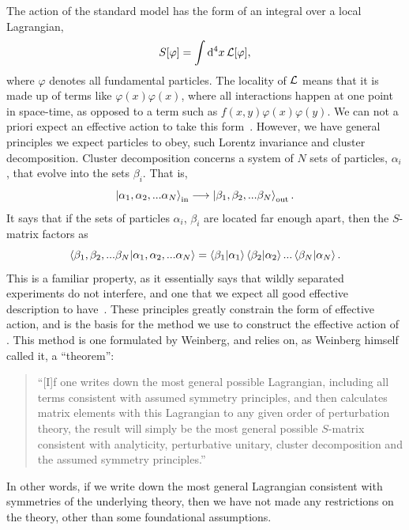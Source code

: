The action of the standard model has the form of an integral over a local Lagrangian,
\begin{equation}
    S[\varphi] = \int \dd^4 x \, \mathcal{L}[\varphi],
\end{equation}
where $\varphi$ denotes all fundamental particles.
The locality of $\mathcal{L}$ means that it is made up of terms like $\varphi(x) \varphi(x)$, where all interactions happen at one point in space-time, as opposed to a term such as $f(x, y)\varphi(x) \varphi(y)$.
We can not a priori expect an effective action to take this form~\cite{Schwartz:QFT}.
However, we have general principles we expect particles to obey, such Lorentz invariance and cluster decomposition.
Cluster decomposition concerns a system of $N$ sets of particles, $\alpha_i$, that evolve into the sets $\beta_i$.
That is,
\begin{equation}
    \ket{\alpha_1, \alpha_2, ... \alpha_N}_\text{in}
    \longrightarrow
    \ket{\beta_1, \beta_2, ... \beta_N}_\text{out}.
\end{equation}
It says that if the sets of particles $\alpha_i$, $\beta_i$ are located far enough apart, then the $S$-matrix factors as
\begin{equation}
    {\braket{\beta_1, \beta_2, ... \beta_N}{\alpha_1, \alpha_2, ... \alpha_N}}
    =
    \braket{\beta_1}{\alpha_1}\braket{\beta_2}{\alpha_2}... \braket{\beta_N}{\alpha_N}.
\end{equation}
This is a familiar property, as it essentially says that wildly separated experiments do not interfere, and one that we expect all good effective description to have~\cite{weinberg_1995,weinberg_1996_vol2}.
These principles greatly constrain the form of effective action, and is the basis for the method we use to construct the effective action of \chpt.
This method is one formulated by Weinberg, and relies on, as Weinberg himself called it, a ``theorem'':
\begin{quote}
    ``[I]f one writes down the most general possible Lagrangian, including all terms consistent with assumed symmetry principles, and then calculates matrix elements with this Lagrangian to any given order of perturbation theory, the result will simply be the most general possible $S$-matrix consistent with analyticity, perturbative unitary, cluster decomposition and the assumed symmetry principles.'' \cite{WeinbergPhenom}
\end{quote}
In other words, if we write down the most general Lagrangian consistent with symmetries of the underlying theory, then we have not made any restrictions on the theory, other than some foundational assumptions.
